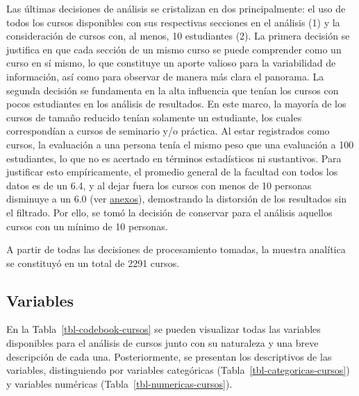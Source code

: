 \documentclass[
  spanish,
  a4paper,
  oneside]{scrbook}
\begin{document}
Las últimas decisiones de análisis se cristalizan en dos principalmente:
el uso de todos los cursos disponibles con sus respectivas secciones en
el análisis (1) y la consideración de cursos con, al menos, 10
estudiantes (2). La primera decisión se justifica en que cada sección de
un mismo curso se puede comprender como un curso en sí mismo, lo que
constituye un aporte valioso para la variabilidad de información, así
como para observar de manera más clara el panorama. La segunda decisión
se fundamenta en la alta influencia que tenían los cursos con pocos
estudiantes en los análisis de resultados. En este marco, la mayoría de
los cursos de tamaño reducido tenían solamente un estudiante, los cuales
correspondían a cursos de seminario y/o práctica. Al estar registrados
como cursos, la evaluación a una persona tenía el mismo peso que una
evaluación a 100 estudiantes, lo que no es acertado en términos
estadísticos ni sustantivos. Para justificar esto empíricamente, el
promedio general de la facultad con todos los datos es de un 6.4, y al
dejar fuera los cursos con menos de 10 personas disminuye a un 6.0 (ver
\href{https://tomasurzuam.github.io/estudio-notas/docs/apendices/C-anexos-cursos.html}{anexos}),
demostrando la distorsión de los resultados sin el filtrado. Por ello,
se tomó la decisión de conservar para el análisis aquellos cursos con un
mínimo de 10 personas.

A partir de todas las decisiones de procesamiento tomadas, la muestra
analítica se constituyó en un total de 2291 cursos.

\subsection{Variables}\label{variables-1}

En la Tabla~\ref{tbl-codebook-cursos} se pueden visualizar todas las
variables disponibles para el análisis de cursos junto con su naturaleza
y una breve descripción de cada una. Posteriormente, se presentan los
descriptivos de las variables, distinguiendo por variables categóricas
(Tabla~\ref{tbl-categoricas-cursos}) y variables numéricas
(Tabla~\ref{tbl-numericas-cursos}).
\end{document}
